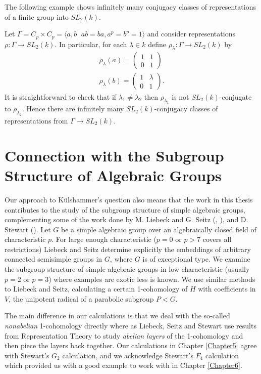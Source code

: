 The following example shows infinitely many conjugacy classes of representations of a finite group into $SL_2(k)$.
\begin{example}
  Let $\Gamma = C_p \times C_p = \langle a, b \,|\, ab = ba, a^p = b^p = 1 \rangle$ and consider representations $\rho: \Gamma \rightarrow SL_2(k)$. In particular, for each $\lambda \in k$ define $\rho_\lambda: \Gamma \rightarrow SL_2(k)$ by
  \begin{eqnarray*}
    \rho_\lambda(a) = \left( \begin{matrix} 1 & 1 \\ 0 & 1 \end{matrix} \right) \\
    \rho_\lambda(b) = \left( \begin{matrix} 1 & \lambda \\ 0 & 1 \end{matrix} \right).
  \end{eqnarray*}
  It is straightforward to check that if $\lambda_1 \neq \lambda_2$ then $\rho_{\lambda_1}$ is not $SL_2(k)$-conjugate to $\rho_{\lambda_2}$. Hence there are infinitely many $SL_2(k)$-conjugacy classes of representations from $\Gamma \rightarrow SL_2(k)$.
\end{example}

\section{Connection with the Subgroup Structure of Algebraic Groups}

Our approach to K\"ulshammer's question also means that the work in this thesis contributes to the study of the subgroup structure of simple algebraic groups, complementing some of the work done by M. Liebeck and G. Seitz (\cite{liebeck1996reductive}, \cite{liebeck2004maximal}), and D. Stewart (\cite{stewart2010g}). Let $G$ be a simple algebraic group over an algebraically closed field of characteristic $p$. For large enough characteristic ($p=0$ or $p>7$ covers all restrictions) Liebeck and Seitz determine explicitly the embeddings of arbitrary connected semisimple groups in $G$, where $G$ is of exceptional type. We examine the subgroup structure of simple algebraic groups in low characteristic (usually $p=2$ or $p=3$) where examples are exotic less is known. We use similar methods to Liebeck and Seitz, calculating a certain 1-cohomology of $H$ with coefficients in $V$, the unipotent radical of a parabolic subgroup $P < G$.

The main difference in our calculations is that we deal with the so-called \emph{nonabelian} 1-cohomology directly where as Liebeck, Seitz and Stewart use results from Representation Theory to study \emph{abelian layers} of the 1-cohomology and then piece the layers back together. Our calculations in Chapter \ref{Chapter5} agree with Stewart's $G_2$ calculation, and we acknowledge Stewart's $F_4$ calculation which provided us with a good example to work with in Chapter \ref{Chapter6}.

